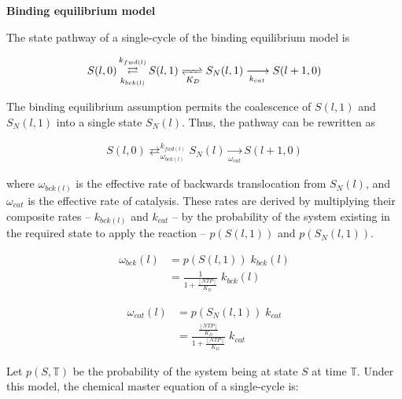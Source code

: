 \documentclass[10pt,letterpaper]{article}
\begin{document}
\textbf{Binding equilibrium model} \par


The state pathway of a single-cycle of the binding equilibrium model is


\begin{eqnarray}
S(l,0) \mathop{\rightleftarrows}_{k_{bck(l)}}^{k_{fwd(l)}} S(l,1) \xrightleftharpoons[K_D]{} S_N(l,1) \xrightarrow[k_{cat}]{} S(l+1,0)
\end{eqnarray}


The binding equilibrium assumption permits the coalescence of $S(l,1)$ and $S_N(l,1)$ into a single state $S_N(l)$. Thus, the pathway can be rewritten as


\begin{eqnarray}
S(l,0) \mathop{\rightleftarrows}_{\omega_{bck(l)}}^{k_{fwd(l)}} S_N(l)  \xrightarrow[\omega_{cat}]{} S(l+1,0)
\end{eqnarray}

where $\omega_{bck(l)}$ is the effective rate of backwards translocation from $S_N(l)$, and $\omega_{cat}$ is the effective rate of catalysis. These rates are derived by multiplying their composite rates  -- $k_{bck(l)}$ and $k_{cat}$ -- by the probability of the system existing in the required state to apply the reaction -- $p(S(l,1))$ and $p( S_N(l,1))$.


\begin{align}
    \omega_{bck}(l) &= p( S(l,1) ) \; k_{bck}(l) \\
    &= \frac{1}{ 1 + \frac{[NTP]}{K_D}} \; k_{bck}(l)
\end{align}



\begin{align}
    \omega_{cat}(l) &= p( S_N(l,1) ) \; k_{cat} \\
    &= \frac{ \frac{[NTP]}{K_D} }{ 1 + \frac{[NTP]}{K_D}} \; k_{cat}
\end{align}


Let $p(S, \mathbb{T})$ be the probability of the system being at state $S$ at time $\mathbb{T}$. Under this model, the chemical master equation of a single-cycle is:
\end{document}
